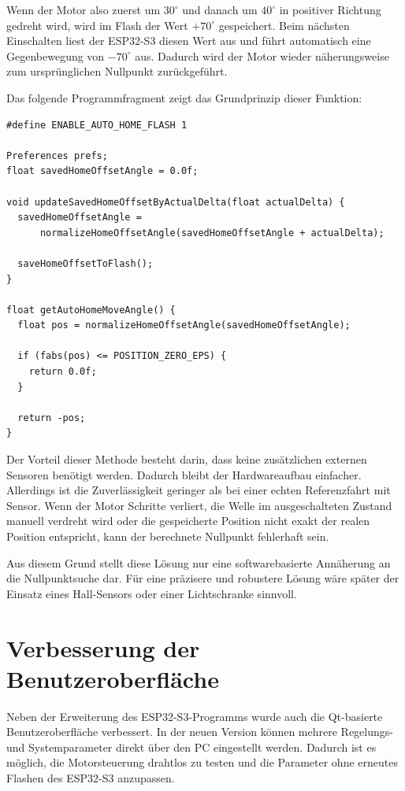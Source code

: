 \documentclass[a4paper,12pt]{article}
\begin{document}
Wenn der Motor also zuerst um \(30^\circ\) und danach um \(40^\circ\) in positiver Richtung gedreht wird, wird im Flash der Wert \(+70^\circ\) gespeichert. Beim nächsten Einschalten liest der ESP32-S3 diesen Wert aus und führt automatisch eine Gegenbewegung von \(-70^\circ\) aus. Dadurch wird der Motor wieder näherungsweise zum ursprünglichen Nullpunkt zurückgeführt.

Das folgende Programmfragment zeigt das Grundprinzip dieser Funktion:

\begin{verbatim}
#define ENABLE_AUTO_HOME_FLASH 1

Preferences prefs;
float savedHomeOffsetAngle = 0.0f;

void updateSavedHomeOffsetByActualDelta(float actualDelta) {
  savedHomeOffsetAngle =
      normalizeHomeOffsetAngle(savedHomeOffsetAngle + actualDelta);

  saveHomeOffsetToFlash();
}

float getAutoHomeMoveAngle() {
  float pos = normalizeHomeOffsetAngle(savedHomeOffsetAngle);

  if (fabs(pos) <= POSITION_ZERO_EPS) {
    return 0.0f;
  }

  return -pos;
}
\end{verbatim}

Der Vorteil dieser Methode besteht darin, dass keine zusätzlichen externen Sensoren benötigt werden. Dadurch bleibt der Hardwareaufbau einfacher. Allerdings ist die Zuverlässigkeit geringer als bei einer echten Referenzfahrt mit Sensor. Wenn der Motor Schritte verliert, die Welle im ausgeschalteten Zustand manuell verdreht wird oder die gespeicherte Position nicht exakt der realen Position entspricht, kann der berechnete Nullpunkt fehlerhaft sein.

Aus diesem Grund stellt diese Lösung nur eine softwarebasierte Annäherung an die Nullpunktsuche dar. Für eine präzisere und robustere Lösung wäre später der Einsatz eines Hall-Sensors oder einer Lichtschranke sinnvoll.


\section{Verbesserung der Benutzeroberfläche}

Neben der Erweiterung des ESP32-S3-Programms wurde auch die Qt-basierte Benutzeroberfläche verbessert. In der neuen Version können mehrere Regelungs- und Systemparameter direkt über den PC eingestellt werden. Dadurch ist es möglich, die Motorsteuerung drahtlos zu testen und die Parameter ohne erneutes Flashen des ESP32-S3 anzupassen.
\end{document}
